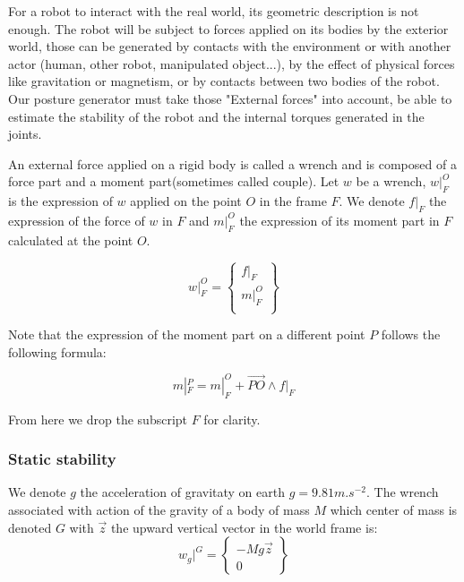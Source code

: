 For a robot to interact with the real world, its geometric description is not enough.
The robot will be subject to forces applied on its bodies by the exterior world, those can be generated by contacts with the environment or with another actor (human, other robot, manipulated object...), by the effect of physical forces like gravitation or magnetism, or by contacts between two bodies of the robot.
Our posture generator must take those "External forces" into account, be able to estimate the stability of the robot and the internal torques generated in the joints.

An external force applied on a rigid body is called a wrench and is composed of a force part and a moment part(sometimes called couple).
Let $w$ be a wrench, $w|_F^O$ is the expression of $w$ applied on the point $O$ in the frame $F$.
We denote $f|_F$ the expression of the force of $w$ in $F$ and $m|_F^O$ the expression of its moment part in $F$ calculated at the point $O$.

\begin{equation}
  w|_F^O = \left\{ \begin{array}{r}
    f|_F\\
    m|_F^O\\
  \end{array} \right\}
\end{equation}

Note that the expression of the moment part on a different point $P$ follows the following formula:

\begin{equation}
  m|_F^P = m|_F^O + \overrightarrow{PO} \wedge f|_F
\end{equation}

From here we drop the subscript $F$ for clarity.

\subsubsection{Static stability}
\label{subsub:static_stability}

We denote $g$ the acceleration of gravitaty on earth $g = 9.81 m.s^{-2}$.
The wrench associated with action of the gravity of a body of mass $M$ which center of mass is denoted $G$ with $\vec{z}$ the upward vertical vector in the world frame is:
\begin{equation}
  w_g|^G = \left\{ \begin{array}{r}
     -Mg\vec{z} \\
     0
  \end{array}\right\}
\end{equation}

